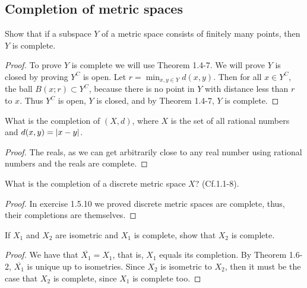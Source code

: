 \subsection{Completion of metric spaces}


\begin{exercise}{1}
Show that if a subspace $Y$ of a metric space consists of finitely many points, then $Y$ is complete.
\end{exercise}
\begin{proof}
To prove $Y$ is complete we will use Theorem 1.4-7. We will prove $Y$ is closed by proving $Y^C$ is open. Let $r=\min_{x,y\in Y}d(x,y)$. Then for all $x\in Y^C$, the ball $B(x;r)\subset Y^C$, because there is no point in $Y$ with distance less than $r$ to $x$. Thus $Y^C$ is open, $Y$ is closed, and by Theorem 1.4-7, $Y$ is complete.
\end{proof}

\begin{exercise}{2}
What is the completion of $(X,d)$, where $X$ is the set of all rational numbers and $d(x,y)=\left\lvert x-y\right\rvert$.
\end{exercise}
\begin{proof}
The reals, as we can get arbitrarily close to any real number using rational numbers and the reals are complete.
\end{proof}

\begin{exercise}{3}
What is the completion of a discrete metric space $X$? (Cf.1.1-8).
\end{exercise}
\begin{proof}
In exercise 1.5.10 we proved discrete metric spaces are complete, thus, their completions are themselves.
\end{proof}

\begin{exercise}{4}
If $X_1$ and $X_2$ are isometric and $X_1$ is complete, show that $X_2$ is complete.
\end{exercise}
\begin{proof}
We have that $\overline{X_1}=X_1$, that is, $X_1$ equals its completion. By Theorem 1.6-2, $\overline{X_1}$ is unique up to isometries. Since $X_2$ is isometric to $X_2$, then it must be the case that $X_2$ is complete, since $X_1$ is complete too.
\end{proof}

